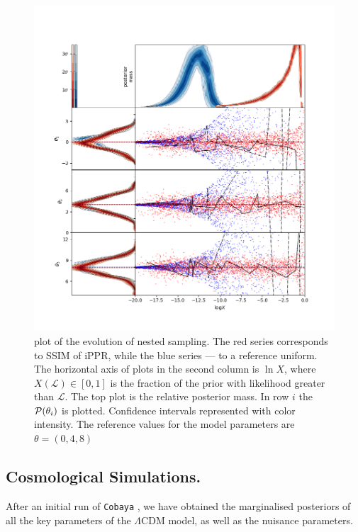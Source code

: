 \documentclass[usenatbib]{mnras}
\begin{document}
\begin{figure}
\includegraphics[width=.99\textwidth]{./illustrations/higson.png}
\caption{plot of the evolution of nested sampling. The \color{red} red
  \color{black} series corresponds to SSIM of iPPR, while the
  \color{blue} blue \color{black} series --- to a reference
  uniform. The horizontal axis of plots in the second column is
  \(\ln X\), where \(X(\mathcal{L}) \in [0,1]\) is the fraction of the
  prior with likelihood greater than \(\mathcal{L}\). The top plot is
  the relative posterior mass. In row $i$ the ${\cal P}(\theta_{i})$
  is plotted. Confidence intervals represented with color
  intensity. The reference values for the model parameters are
  \(\theta = (0, 4, 8)\) \label{fig:higson}}
\end{figure}

\subsection{Cosmological Simulations.}\label{sec:orgb81c159}
After an initial run of \texttt{Cobaya} \citep{cobaya}, we have obtained the marginalised
posteriors of all the key parameters of the \(\Lambda\)CDM model,
as well as the nuisance parameters.
\end{document}
